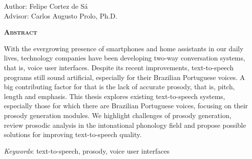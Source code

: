 \begin{center}
	{\Large{\textbf{\tccTitleEn}}}
\end{center}

\vspace{1cm}

\begin{flushright}
	Author: Felipe Cortez de Sá \\
	Advisor: Carlos Augusto Prolo, Ph.D.
\end{flushright}

\vspace{1cm}

\begin{center}
	\Large{\textsc{\textbf{Abstract}}}
\end{center}

\noindent With the evergrowing presence of smartphones and home assistants in
our daily lives, technology companies have been developing two-way conversation
systems, that is, voice user interfaces. Despite its recent improvements,
text-to-speech programs still sound artificial, especially for their Brazilian
Portuguese voices. A big contributing factor for that is the lack of accurate
prosody, that is, pitch, length and emphasis. This thesis explores existing
text-to-speech systems, especially those for which there are Brazilian
Portuguese voices, focusing on their prosody generation modules. We highlight
challenges of prosody generation, review prosodic analysis in the intonational phonology field and propose possible solutions for improving text-to-speech quality.


\noindent\textit{Keywords}: text-to-speech, prosody, voice user interfaces
